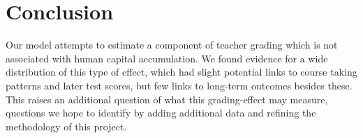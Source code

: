 \documentclass[../thesis_main.tex]{subfiles}
\begin{document}
\doublespacing
\section{Conclusion}
\label{section:conclusion}

Our model attempts to estimate a component of teacher grading which is not associated with human capital accumulation. We found evidence for a wide distribution of this type of effect, which had slight potential links to course taking patterns and later test scores, but few links to long-term outcomes besides these. This raises an additional question of what this grading-effect may measure, questions we hope to identify by adding additional data and refining the methodology of this project. 
\end{document}
